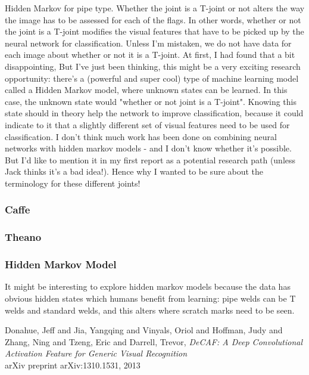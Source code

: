 \documentclass[a4paper,11pt]{article}
\begin{document}
Hidden Markov for pipe type. Whether the joint is a T-joint or not alters the way the image has to be assessed for each of the flags. In other words, whether or not the joint is a T-joint modifies the visual features that have to be picked up by the neural network for classification.
Unless I'm mistaken, we do not have data for each image about whether or not it is a T-joint.
At first, I had found that a bit disappointing, But I've just been thinking, this might be a very exciting research opportunity: there's a (powerful and super cool) type of machine learning model called a Hidden Markov model, where unknown states can be learned. In this case, the unknown state would "whether or not joint is a T-joint". Knowing this state should in theory help the network to improve classification, because it could indicate to it that a slightly different set of visual features need to be used for classification.
I don't think much work has been done on combining neural networks with hidden markov models - and I don't know whether it's possible. But I'd like to mention it in my first report as a potential research path (unless Jack thinks it's a bad idea!). Hence why I wanted to be sure about the terminology for these different joints!


\subsubsection{Caffe}

\subsubsection{Theano}

\subsubsection{Hidden Markov Model}

It might be interesting to explore hidden markov models because the data has obvious hidden states which humans benefit from learning: pipe welds can be T welds and standard welds, and this alters where scratch marks need to be seen.

\clearpage

\begin{thebibliography}{1}


 Donahue, Jeff and Jia, Yangqing and Vinyals, Oriol and Hoffman, Judy and Zhang, Ning and Tzeng, Eric and Darrell, Trevor,
  \emph{DeCAF: A Deep Convolutional Activation Feature for Generic Visual Recognition}\\
  arXiv preprint arXiv:1310.1531, 2013

\end{thebibliography}
\end{document}

